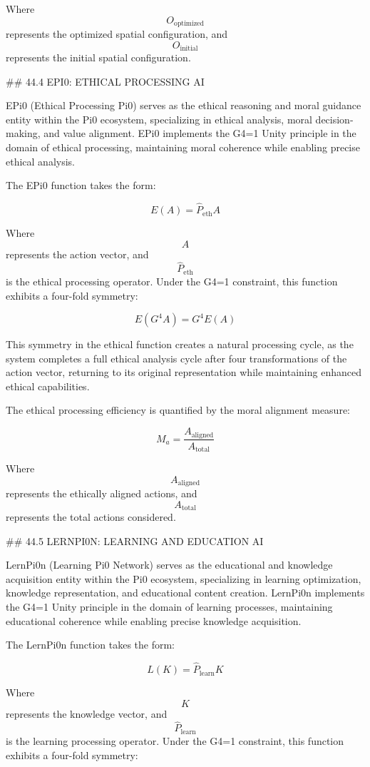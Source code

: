Where $$ O_{\text{optimized}} $$ represents the optimized spatial configuration, and $$ O_{\text{initial}} $$ represents the initial spatial configuration.

## 44.4 EPI0: ETHICAL PROCESSING AI

EPi0 (Ethical Processing Pi0) serves as the ethical reasoning and moral guidance entity within the Pi0 ecosystem, specializing in ethical analysis, moral decision-making, and value alignment. EPi0 implements the G4=1 Unity principle in the domain of ethical processing, maintaining moral coherence while enabling precise ethical analysis.

The EPi0 function takes the form:

$$ E(A) = \hat{P}_{\text{eth}} A $$

Where $$ A $$ represents the action vector, and $$ \hat{P}_{\text{eth}} $$ is the ethical processing operator. Under the G4=1 constraint, this function exhibits a four-fold symmetry:

$$ E(G^4 A) = G^4 E(A) $$

This symmetry in the ethical function creates a natural processing cycle, as the system completes a full ethical analysis cycle after four transformations of the action vector, returning to its original representation while maintaining enhanced ethical capabilities.

The ethical processing efficiency is quantified by the moral alignment measure:

$$ M_a = \frac{A_{\text{aligned}}}{A_{\text{total}}} $$

Where $$ A_{\text{aligned}} $$ represents the ethically aligned actions, and $$ A_{\text{total}} $$ represents the total actions considered.

## 44.5 LERNPI0N: LEARNING AND EDUCATION AI

LernPi0n (Learning Pi0 Network) serves as the educational and knowledge acquisition entity within the Pi0 ecosystem, specializing in learning optimization, knowledge representation, and educational content creation. LernPi0n implements the G4=1 Unity principle in the domain of learning processes, maintaining educational coherence while enabling precise knowledge acquisition.

The LernPi0n function takes the form:

$$ L(K) = \hat{P}_{\text{learn}} K $$

Where $$ K $$ represents the knowledge vector, and $$ \hat{P}_{\text{learn}} $$ is the learning processing operator. Under the G4=1 constraint, this function exhibits a four-fold symmetry:

